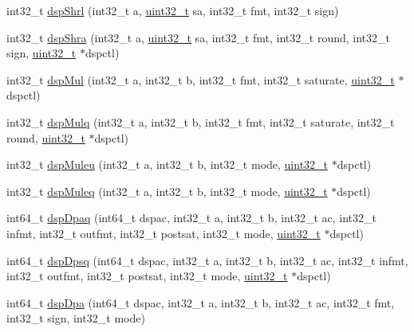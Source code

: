 \begin{DoxyCompactItemize}
\item 
int32\_\-t \hyperlink{namespaceMipsISA_a3a5769efff7a137e7cc0bbbfa2eb8d74}{dspShrl} (int32\_\-t a, \hyperlink{Type_8hh_a435d1572bf3f880d55459d9805097f62}{uint32\_\-t} sa, int32\_\-t fmt, int32\_\-t sign)
\item 
int32\_\-t \hyperlink{namespaceMipsISA_a4664f70ef32674a9d5794fd932ce58bd}{dspShra} (int32\_\-t a, \hyperlink{Type_8hh_a435d1572bf3f880d55459d9805097f62}{uint32\_\-t} sa, int32\_\-t fmt, int32\_\-t round, int32\_\-t sign, \hyperlink{Type_8hh_a435d1572bf3f880d55459d9805097f62}{uint32\_\-t} $\ast$dspctl)
\item 
int32\_\-t \hyperlink{namespaceMipsISA_a6b76ad8042f64cf6a93b1b6b8ec59d46}{dspMul} (int32\_\-t a, int32\_\-t b, int32\_\-t fmt, int32\_\-t saturate, \hyperlink{Type_8hh_a435d1572bf3f880d55459d9805097f62}{uint32\_\-t} $\ast$dspctl)
\item 
int32\_\-t \hyperlink{namespaceMipsISA_a3006e33638ef226180920245f581d7a2}{dspMulq} (int32\_\-t a, int32\_\-t b, int32\_\-t fmt, int32\_\-t saturate, int32\_\-t round, \hyperlink{Type_8hh_a435d1572bf3f880d55459d9805097f62}{uint32\_\-t} $\ast$dspctl)
\item 
int32\_\-t \hyperlink{namespaceMipsISA_ad49f6da026197c52744cb3aa8fea0d39}{dspMuleu} (int32\_\-t a, int32\_\-t b, int32\_\-t mode, \hyperlink{Type_8hh_a435d1572bf3f880d55459d9805097f62}{uint32\_\-t} $\ast$dspctl)
\item 
int32\_\-t \hyperlink{namespaceMipsISA_a1c1ae7be51569f81566b140606caa2bd}{dspMuleq} (int32\_\-t a, int32\_\-t b, int32\_\-t mode, \hyperlink{Type_8hh_a435d1572bf3f880d55459d9805097f62}{uint32\_\-t} $\ast$dspctl)
\item 
int64\_\-t \hyperlink{namespaceMipsISA_a972387186c5bda88a6be1af70b202fd6}{dspDpaq} (int64\_\-t dspac, int32\_\-t a, int32\_\-t b, int32\_\-t ac, int32\_\-t infmt, int32\_\-t outfmt, int32\_\-t postsat, int32\_\-t mode, \hyperlink{Type_8hh_a435d1572bf3f880d55459d9805097f62}{uint32\_\-t} $\ast$dspctl)
\item 
int64\_\-t \hyperlink{namespaceMipsISA_af540064c201122fe024672680efb7b83}{dspDpsq} (int64\_\-t dspac, int32\_\-t a, int32\_\-t b, int32\_\-t ac, int32\_\-t infmt, int32\_\-t outfmt, int32\_\-t postsat, int32\_\-t mode, \hyperlink{Type_8hh_a435d1572bf3f880d55459d9805097f62}{uint32\_\-t} $\ast$dspctl)
\item 
int64\_\-t \hyperlink{namespaceMipsISA_aed3186e17a520b2f8e0086ffdd7020d4}{dspDpa} (int64\_\-t dspac, int32\_\-t a, int32\_\-t b, int32\_\-t ac, int32\_\-t fmt, int32\_\-t sign, int32\_\-t mode)

\end{DoxyCompactItemize}
